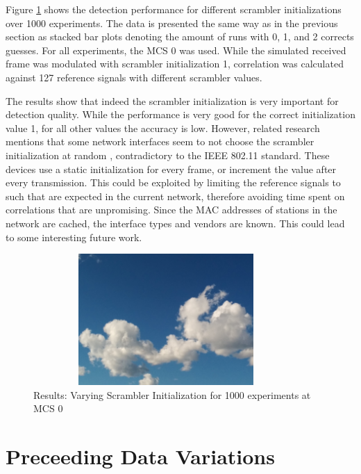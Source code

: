 Figure \ref{fig:vary_scrambler} shows the detection performance for different scrambler initializations over 1000 experiments. The data is presented the same way as in the previous section as stacked bar plots denoting the amount of runs with 0, 1, and 2 corrects guesses. For all experiments, the \gls{MCS} 0 was used. While the simulated received frame was modulated with scrambler initialization 1, correlation was calculated against 127 reference signals with different scrambler values.

The results show that indeed the scrambler initialization is very important for detection quality. While the performance is very good for the correct initialization value 1, for all other values the accuracy is low. However, related research mentions that some network interfaces seem to not choose the scrambler initialization at random \cite{NEEDED}, contradictory to the IEEE 802.11 standard. These devices use a static initialization for every frame, or increment the value after every transmission. This could be exploited by limiting the reference signals to such that are expected in the current network, therefore avoiding time spent on correlations that are unpromising. Since the MAC addresses of stations in the network are cached, the interface types and vendors are known. This could lead to some interesting future work.

\begin{figure}[H]
	\centering
	\includegraphics[width=0.9\textwidth,height=5cm]{gfx/images/stock-clouds}
	\caption[Results: Varying Scrambler Initialization for 1000 experiments]{Results: Varying Scrambler Initialization for 1000 experiments at MCS 0}
	\label{fig:vary_scrambler}
\end{figure}



\section{Preceeding Data Variations}\label{sec:ex-destination}

